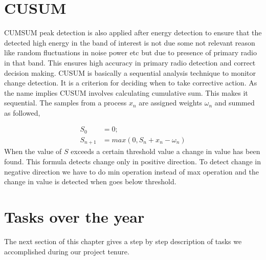 \section{CUSUM}
CUMSUM peak detection is also applied after energy detection to ensure that the
detected high energy in the band of interest is not due some  not relevant 
reason like random fluctuations in noise power etc but due to presence of 
primary radio in that band. This ensures high accuracy in primary radio 
detection and correct decision making.
CUSUM is basically a sequential analysis technique to monitor change detection. 
It is a criterion for deciding when to take corrective action. As the name 
implies CUSUM involves calculating cumulative sum. This makes it sequential. 
The samples from a process $x_n$  are assigned weights $\omega_n$  and summed as followed,

\begin{align}
S_0 &= 0; \nonumber \\
S_{n+1} &= max(0, S_n + x_n - \omega_n) \nonumber
\end{align}
When the value of $S$ exceeds a certain threshold value a change in value has 
been found. This formula detects change only in positive direction. To detect 
change in negative direction we have to do min operation instead of max 
operation and the change in value is detected when goes below threshold.







\section{Tasks over the year}
The next section of this chapter gives a step by step description of tasks we 
accomplished during our project tenure. 

